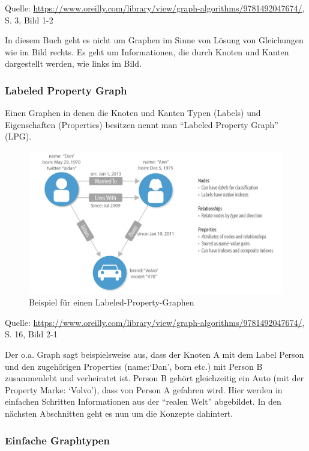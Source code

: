 \documentclass[12pt,ngerman,]{article}
\begin{document}
Quelle:
\href{Needham/Hodler\%202019}{https://www.oreilly.com/library/view/graph-algorithms/9781492047674/},
S. 3, Bild 1-2

In diesem Buch geht es nicht um Graphen im Sinne von Lösung von
Gleichungen wie im Bild rechts. Es geht um Informationen, die durch
Knoten und Kanten dargestellt werden, wie links im Bild.

\subsubsection{Labeled Property Graph}\label{labeled-property-graph}

Einen Graphen in denen die Knoten und Kanten Typen (Labels) und
Eigenschaften (Properties) besitzen nennt man ``Labeled Property Graph''
(LPG).

\begin{figure}
\centering
\includegraphics{Bilder/Graph-Algorithms/16-2-1-LabeledPropertyGraph.png}
\caption{Beispiel für einen Labeled-Property-Graphen}
\end{figure}

Quelle:
\href{Needham/Hodler\%202019}{https://www.oreilly.com/library/view/graph-algorithms/9781492047674/},
S. 16, Bild 2-1

Der o.a. Graph sagt beispielsweise aus, dass der Knoten A mit dem Label
Person und den zugehörigen Properties (name:`Dan', born etc.) mit Person
B zusammenlebt und verheiratet ist. Person B gehört gleichzeitig ein
Auto (mit der Property Marke: `Volvo'), dass von Person A gefahren wird.
Hier werden in einfachen Schritten Informationen aus der ``realen Welt''
abgebildet. In den nächsten Abschnitten geht es nun um die Konzepte
dahintert.

\subsubsection{Einfache Graphtypen}\label{einfache-graphtypen}
\end{document}
